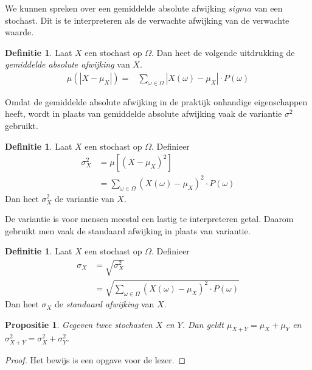 \documentclass[a4paper]{book}
\newtheorem{proposition}[theorem]{Propositie}
\theoremstyle{definition}
\newtheorem{definition}[theorem]{Definitie}
\begin{document}
We kunnen spreken over een gemiddelde absolute afwijking $sigma$ van een stochast. Dit is te interpreteren als de verwachte afwijking van de verwachte waarde.

\begin{definition}
    Laat $X$ een stochast op $\Omega$.
    Dan heet de volgende uitdrukking de \emph{gemiddelde absolute afwijking} van $X$.
    \begin{align*}
        \mu( |X - \mu_X| ) = & \sum_{\omega \in \Omega} |X(\omega) - \mu_X| \cdot P(\omega)
    \end{align*}
\end{definition}

Omdat de gemiddelde absolute afwijking in de praktijk onhandige eigenschappen heeft, wordt in plaats van gemiddelde absolute afwijking vaak de
variantie $\sigma^2$ gebruikt.

\begin{definition}
    Laat $X$ een stochast op $\Omega$.
    Definieer
    \begin{align*}
        \sigma^2_X &= \mu[ {(X - \mu_X)}^2 ] \\
                   &= \sum_{\omega \in \Omega} {(X(\omega) - \mu_X)}^2 \cdot P(\omega)
    \end{align*}
    Dan heet $\sigma^2_X$ de variantie van $X$.
\end{definition}

De variantie is voor mensen meestal een lastig te interpreteren getal. Daarom gebruikt men vaak de standaard afwijking in plaats van variantie.

\begin{definition}
    Laat $X$ een stochast op $\Omega$.
    Definieer
    \begin{align*}
        \sigma_X &= \sqrt{\sigma^2_X} \\
                 &= \sqrt{\sum_{\omega \in \Omega} {(X(\omega) - \mu_X)}^2 \cdot P(\omega)}
    \end{align*}
    Dan heet $\sigma_X$ de \emph{standaard afwijking} van $X$.
\end{definition}


\begin{proposition}\label{stochast_somregel}
    Gegeven twee stochasten $X$ en $Y$.
    Dan geldt $\mu_{X+Y} = \mu_X + \mu_Y$ en $\sigma^2_{X+Y} = \sigma^2_X + \sigma^2_Y$.
\end{proposition}
\begin{proof}
    Het bewijs is een opgave voor de lezer.
\end{proof}
\end{document}
